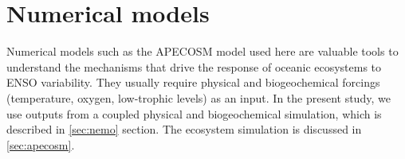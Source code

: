 \section{Numerical models}
\label{sec:model-des}

Numerical models such as the APECOSM model used here are valuable tools to understand the mechanisms that drive the response of oceanic ecosystems to ENSO variability. They usually require physical and biogeochemical forcings (temperature, oxygen, low-trophic levels) as an input. In the present study, we use outputs from a coupled physical and biogeochemical simulation, which is described in \ref{sec:nemo} section. The ecosystem simulation is discussed in \ref{sec:apecosm}.





